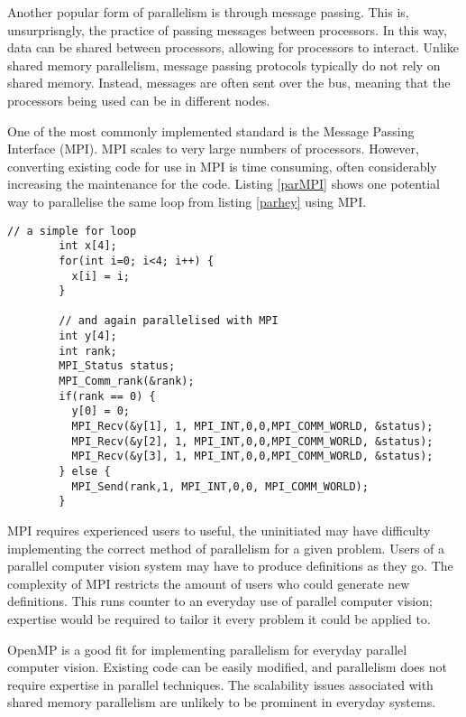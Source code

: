 \documentclass[../main.tex]{subfiles}
\begin{document}
      Another popular form of parallelism is through message passing.
      This is, unsurprisngly, the practice of passing messages between processors.
      In this way, data can be shared between processors, allowing for processors to interact.
      Unlike shared memory parallelism, message passing protocols typically do not rely on shared memory.
      Instead, messages are often sent over the bus, meaning that the processors being used can be in different nodes.

      One of the most commonly implemented standard is the Message Passing Interface (MPI).
      MPI scales to very large numbers of processors.
      However, converting existing code for use in MPI is time consuming, often considerably increasing the maintenance for the code.
      Listing \ref{parMPI} shows one potential way to parallelise the same loop from listing \ref{parhey} using MPI.
      \begin{lstlisting}[caption = 'A simple loop parallelised with MPI', label=parMPI]
        // a simple for loop
        int x[4];
        for(int i=0; i<4; i++) {
          x[i] = i;
        }

        // and again parallelised with MPI
        int y[4];
        int rank;
        MPI_Status status;
        MPI_Comm_rank(&rank);
        if(rank == 0) {
          y[0] = 0;
          MPI_Recv(&y[1], 1, MPI_INT,0,0,MPI_COMM_WORLD, &status);
          MPI_Recv(&y[2], 1, MPI_INT,0,0,MPI_COMM_WORLD, &status);
          MPI_Recv(&y[3], 1, MPI_INT,0,0,MPI_COMM_WORLD, &status);
        } else {
          MPI_Send(rank,1, MPI_INT,0,0, MPI_COMM_WORLD);
        }
      \end{lstlisting}

      MPI requires experienced users to useful, the uninitiated may have difficulty implementing the correct method of parallelism for a given problem.
      Users of a parallel computer vision system may have to produce definitions as they go.
      The complexity of MPI restricts the amount of users who could generate new definitions.
      This runs counter to an everyday use of parallel computer vision; expertise would be required to tailor it every problem it could be applied to.
      
      OpenMP is a good fit for implementing parallelism for everyday parallel computer vision.
      Existing code can be easily modified, and parallelism does not require expertise in parallel techniques.
      The scalability issues associated with shared memory parallelism are unlikely to be prominent in everyday systems.
      
\end{document}
